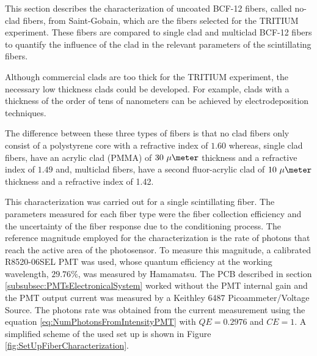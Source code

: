 This section describes the characterization of uncoated BCF-12 fibers, called no-clad fibers, from Saint-Gobain, which are the fibers selected for the TRITIUM experiment. These fibers are compared to single clad and multiclad BCF-12 fibers to quantify the influence of the clad in the relevant parameters of the scintillating fibers.

Although commercial clads are too thick for the TRITIUM experiment, the necessary low thickness clads could be developed. For example, clads with a thickness of the order of tens of nanometers can be achieved by electrodeposition techniques.

The difference between these three types of fibers is that no clad fibers only consist of a polystyrene core with a refractive index of $1.60$ whereas, single clad fibers, have an acrylic clad (PMMA) of $30~\mu\meter$ thickness and a refractive index of $1.49$ and, multiclad fibers, have a second fluor-acrylic clad of $10~\mu\meter$ thickness  and a refractive index of 1.42.




This characterization was carried out for a single scintillating fiber. The parameters measured for each fiber type were the fiber collection efficiency and the uncertainty of the fiber response due to the conditioning process. The reference magnitude employed for the characterization is the rate of photons that reach the active area of the photosensor. To measure this magnitude, a calibrated R8520-06SEL PMT was used, whose quantum efficiency at the working wavelength, $29.76\%$, was measured by Hamamatsu. The PCB described in section \ref{subsubsec:PMTsElectronicalSystem} worked without the PMT internal gain and the PMT output current was measured by a Keithley 6487 Picoammeter/Voltage Source. The photons rate was obtained from the current measurement using the equation \ref{eq:NumPhotonsFromIntensityPMT} with $QE=0.2976$ and $CE=1$. A simplified scheme of the used set up is shown in Figure \ref{fig:SetUpFiberCharacterization}.


